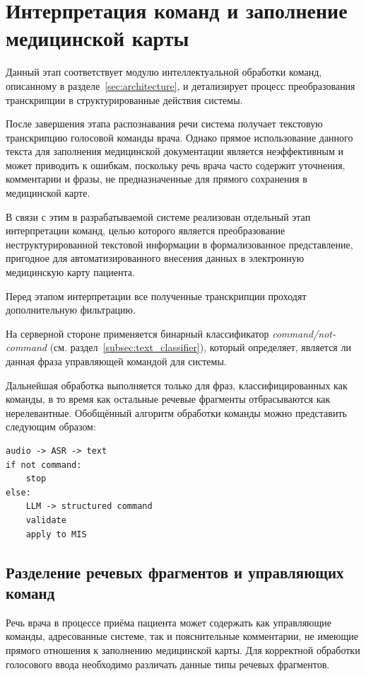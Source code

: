 \clearpage
\section{Интерпретация команд и заполнение медицинской карты}
\label{sec:command_processing}

Данный этап соответствует модулю интеллектуальной обработки команд, описанному в разделе~\ref{sec:architecture}, и детализирует процесс преобразования транскрипции в структурированные действия системы.

После завершения этапа распознавания речи система получает текстовую транскрипцию голосовой команды врача. Однако прямое использование данного текста для заполнения медицинской документации является неэффективным и может приводить к ошибкам, поскольку речь врача часто содержит уточнения, комментарии и фразы, не предназначенные для прямого сохранения в медицинской карте.

В связи с этим в разрабатываемой системе реализован отдельный этап интерпретации команд, целью которого является преобразование неструктурированной текстовой информации в формализованное представление, пригодное для автоматизированного внесения данных в электронную медицинскую карту пациента.

Перед этапом интерпретации все полученные транскрипции проходят дополнительную фильтрацию.

На серверной стороне применяется бинарный классификатор \textit{command/not-command} (см. раздел~\ref{subsec:text_classifier}), который определяет, является ли данная фраза управляющей командой для системы.

Дальнейшая обработка выполняется только для фраз, классифицированных как команды, в то время как остальные речевые фрагменты отбрасываются как нерелевантные.
Обобщённый алгоритм обработки команды можно представить следующим образом:

\begin{verbatim}
audio -> ASR -> text
if not command:
    stop
else:
    LLM -> structured command
    validate
    apply to MIS
\end{verbatim}

\subsection{Разделение речевых фрагментов и управляющих команд}

Речь врача в процессе приёма пациента может содержать как управляющие команды, адресованные системе, так и пояснительные комментарии, не имеющие прямого отношения к заполнению медицинской карты. Для корректной обработки голосового ввода необходимо различать данные типы речевых фрагментов.

